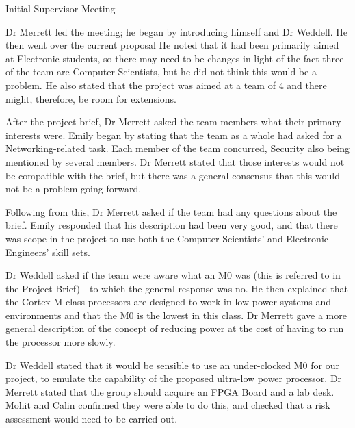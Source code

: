 \documentclass{article}
\begin{document}

\begin{Minutes}{Initial Supervisor Meeting}
\starttime{15:00}
\endtime{16:00}
\location{59/4227}
\maketitle

\topic{Introduction}
Dr Merrett led the meeting; he began by introducing himself and Dr
Weddell. He then went over the current
proposal
He noted that it had
been primarily aimed at Electronic students, so there may need to be
changes in light of the fact three of the team are Computer
Scientists, but he did not think this would be a problem. He also stated
that the project was aimed at a team of 4 and there might, therefore, be
room for extensions.

After the project brief, Dr Merrett asked the team members what their
primary interests were. Emily began by stating that the team as a whole
had asked for a Networking-related task. Each member of the team
concurred, Security also being mentioned by several members. Dr Merrett
stated that those interests would not be compatible with the brief, but
there was a general consensus that this would not be a problem going
forward.

Following from this, Dr Merrett asked if the team had any questions
about the brief. Emily responded that his
description had been very good, and that there was scope in the project
to use both the Computer Scientists' and Electronic Engineers' skill sets.

Dr Weddell asked if the team were aware what an M0 was (this is referred
to in the Project Brief) - to which the general response was no. He then
explained that the Cortex M class processors are designed to work in
low-power systems and environments and that the M0 is the lowest in this
class. Dr Merrett gave a more general description of the concept of
reducing power at the cost of having to run the processor more slowly.

Dr Weddell stated that it would be sensible to use an under-clocked M0
for our project, to emulate the capability of the proposed ultra-low
power processor. Dr Merrett stated that the group should acquire an FPGA Board
and a lab desk. Mohit and Calin confirmed they were able to do this, and
checked that a risk assessment would need to be carried out.


\end{Minutes}
\end{document}

